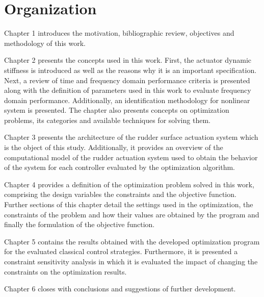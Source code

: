 \section{Organization}

Chapter 1 introduces the motivation, bibliographic review, objectives and methodology of this work.

Chapter 2 presents the concepts used in this work. First, the actuator dynamic stiffness is introduced as well as the reasons why it is an important specification. Next, a review of time and frequency domain performance criteria is presented along with the definition of parameters used in this work to evaluate frequency domain performance. Additionally, an identification methodology for nonlinear system is presented. The chapter also presents concepts on optimization problems, its categories and available techniques for solving them.

Chapter 3 presents the architecture of the rudder surface actuation system which is the object of this study. Additionally, it provides an overview of the computational model of the rudder actuation system used to obtain the behavior of the system for each controller evaluated by the optimization algorithm.

Chapter 4 provides a definition of the optimization problem solved in this work, comprising the design variables the constraints and the objective function. Further sections of this chapter detail the settings used in the optimization, the constraints of the problem and how their values are obtained by the program and finally the formulation of the objective function.

Chapter 5 contains the results obtained with the developed optimization program for the evaluated classical control strategies. Furthermore, it is presented a constraint sensitivity analysis in which it is evaluated the impact of changing the constraints on the optimization results.

Chapter 6 closes with conclusions and suggestions of further development.